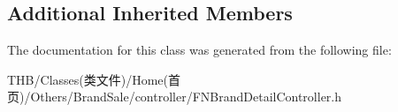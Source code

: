 \subsection*{Additional Inherited Members}


The documentation for this class was generated from the following file\+:\begin{DoxyCompactItemize}
\item 
T\+H\+B/\+Classes(类文件)/\+Home(首页)/\+Others/\+Brand\+Sale/controller/F\+N\+Brand\+Detail\+Controller.\+h\end{DoxyCompactItemize}
